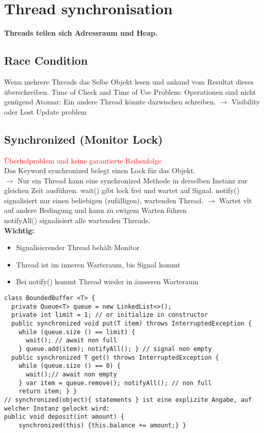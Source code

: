 
\section{Thread synchronisation}
\textbf{Threads teilen sich Adressraum und Heap.}
\subsection{Race Condition}
Wenn mehrere Threads das Selbe Objekt lesen und anhand vom Resultat dieses überschreiben. \textcolor{b}{Time of Check and Time of Use Problem: Operationen sind nicht genügend Atomar: Ein andere Thread könnte dazwischen schreiben. $\rightarrow$ Visibility oder Lost Update problem}
\subsection{Synchronized (Monitor Lock)}
\textcolor{red}{Überholproblem und keine garantierte Reihenfolge}\\
Das Keyword \textcolor{b}{synchronized} belegt einen Lock für das Objekt.\\
$\rightarrow$ Nur ein Thread kann eine synchronized Methode in derselben Instanz zur gleichen Zeit ausführen.
\textcolor{b}{wait()} gibt lock frei und wartet auf Signal. \textcolor{b}{notify()} signalisiert nur einen beliebigen (zufälligen), wartenden Thread. $\rightarrow$ Wartet vlt auf andere Bedingung und kann zu ewigem Warten führen\\
\textcolor{b}{notifyAll()} signalisiert alle wartenden Threads.\\
\textbf{Wichtig:}
\begin{itemize}[topsep=0pt, leftmargin=3mm]
    \setlength\itemsep{-0.3em}
    \item Signalisierender Thread behält Monitor
    \item Thread ist im inneren Warteraum, bis Signal kommt
    \item Bei notify() kommt Thread wieder in äusseren Warteraum
\end{itemize}
\begin{lstlisting}
class BoundedBuffer <T> {
  private Queue<T> queue = new LinkedList<>();
  private int limit = 1; // or initialize in constructor
  public synchronized void put(T item) throws InterruptedException {
    while (queue.size () == limit) {
      wait(); // await non full
    } queue.add(item); notifyAll(); } // signal non empty
  public synchronized T get() throws InterruptedException {
    while (queue.size () == 0) {
      wait();// await non empty
    } var item = queue.remove(); notifyAll(); // non full
    return item; } }
// synchronized(object){ statements } ist eine explizite Angabe, auf welcher Instanz gelockt wird:
public void deposit(int amount) {
    synchronized(this) {this.balance += amount;} }
\end{lstlisting}